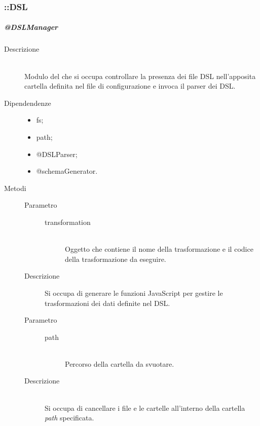 \subsubsection{::DSL}
\subparagraph{@DSLManager}
\begin{description}
 \item[Descrizione] \hfill \\
  Modulo del  che si occupa controllare la presenza dei file DSL nell'apposita cartella definita nel file di configurazione e invoca il parser dei DSL.
 \item[Dipendendenze] \hfill 
 \begin{itemize}
 \item{fs};
  \item{path};
  \item{@DSLParser};
  \item{@schemaGenerator}.
 \end{itemize} 
 \item[Metodi]
 \begin{mldescription}
  \hfill 
  	\begin{description}
   		\item[Parametro] \hfill
   			\begin{description}
   				\item[transformation] \hfill \\
   				Oggetto che contiene il nome della trasformazione e il codice della trasformazione da eseguire.
   			\end{description}
   		\item[Descrizione]
   		Si occupa di generare le funzioni JavaScript per gestire le trasformazioni dei dati definite nel DSL.
   	\end{description}
  \hfill 
   	\begin{description}
    		\item[Parametro] \hfill
    			\begin{description}
    				\item[path] \hfill \\
    				Percorso della cartella da svuotare.
    			\end{description}
    		\item[Descrizione] \hfill \\
    		Si occupa di cancellare i file e le cartelle all'interno della cartella \textit{path} specificata.
    	\end{description}
 

\end{mldescription}
\end{description}
